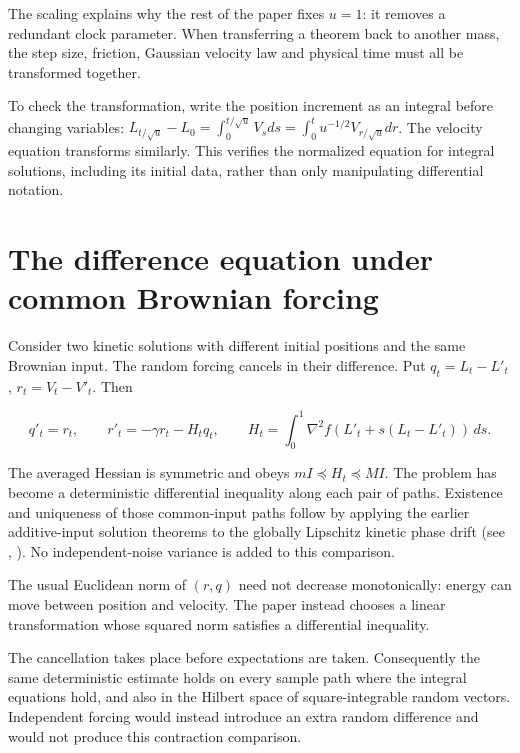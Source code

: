 \documentclass[11pt,a4paper]{report}
\begin{document}
The scaling explains why the rest of the paper fixes \(u=1\): it removes
a redundant clock parameter. When transferring a theorem back to another mass,
the step size, friction, Gaussian velocity law and physical time must all be
transformed together.



To check the transformation, write the position increment as an integral before changing variables: \(L_{t/\sqrt u}-L_0=\int_0^{t/\sqrt u}V_sds=\int_0^tu^{-1/2}V_{r/\sqrt u}dr\). The velocity equation transforms similarly. This verifies the normalized equation for integral solutions, including its initial data, rather than only manipulating differential notation.

\section{\texorpdfstring{The difference equation under common Brownian forcing}{The difference equation under common Brownian forcing}}


Consider two kinetic solutions with different initial positions and the same Brownian input. The random forcing cancels in their difference. Put
\(q_t=L_t-L'_t\), \(r_t=V_t-V'_t\). Then


\[q'_t=r_t,\qquad r'_t=-\gamma r_t-H_tq_t,\qquad
H_t=\int_0^1\nabla^2f(L'_t+s(L_t-L'_t))\,ds.\]


The averaged Hessian is symmetric and obeys \(mI\preceq H_t\preceq MI\).
The problem has become a deterministic differential inequality along each pair
of paths. Existence and uniqueness of those common-input paths follow by applying the earlier additive-input solution theorems to the globally Lipschitz kinetic phase drift (see \cite[Section~3.14.3]{LangevinLean2026ULASC}, \cite[Section~3.43.2]{LangevinLean2026ULASC}). No independent-noise variance is added to this comparison.




The usual Euclidean norm of \((r,q)\) need not decrease monotonically:
energy can move between position and velocity. The paper instead chooses a
linear transformation whose squared norm satisfies a differential inequality.



The cancellation takes place before expectations are taken. Consequently the same deterministic estimate holds on every sample path where the integral equations hold, and also in the Hilbert space of square-integrable random vectors. Independent forcing would instead introduce an extra random difference and would not produce this contraction comparison.
\end{document}
